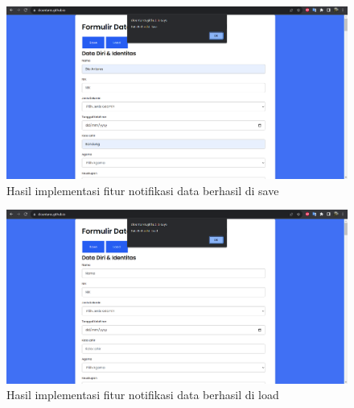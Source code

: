 \begin{figure}[H]
	\centering
	\includegraphics[scale=0.4]{Gambar/saveBerhasil.png}
	\caption{Hasil implementasi fitur notifikasi data berhasil di save} 
	\label{fig:saveBerhasil}
\end{figure}

\begin{figure}[H]
	\centering
	\includegraphics[scale=0.4]{Gambar/loadBerhasil.png}
	\caption{Hasil implementasi fitur notifikasi data berhasil di load} 
	\label{fig:loadBerhasil}
\end{figure}

